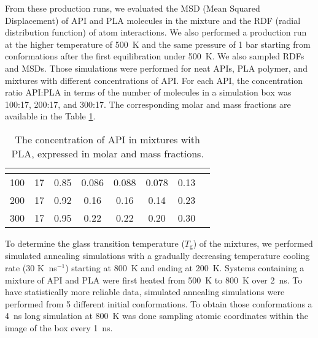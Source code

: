 From these production runs, we evaluated the MSD (Mean Squared Displacement) of API and PLA molecules in the mixture and the RDF (radial distribution function) of atom interactions. We also performed a production run at the higher temperature of 500~K and the same pressure of 1 bar starting from conformations after the first equilibration under 500~K. We also sampled RDFs and MSDs. Those simulations were performed for neat APIs, PLA polymer, and mixtures with different concentrations of API. For each API, the concentration ratio API:PLA in terms of the number of molecules in a simulation box was 100:17, 200:17, and 300:17. The corresponding molar and mass fractions are available in the Table \ref{tab:fractions}.

\begin{table}[h]
	\centering
	\caption{The concentration of API in mixtures with PLA, expressed in molar and mass fractions.}
	\begin{tabular}{cccccccc}
		\toprule
		{\textbf{\boldmath{$N_{\text{API}}$}}} &
		{\textbf{\boldmath{$N_{\text{PLA}}$}}} &
		{\textbf{\boldmath{$x_{\text{API}}$}}} & {\textbf{\boldmath{$w_{\text{nap}}$}}} & {\textbf{\boldmath{$w_{\text{cbz}}$}}} & {\textbf{\boldmath{$w_{\text{ibu}}$}}} & {\textbf{\boldmath{$w_{\text{indo}}$}}} \\
		\midrule
		100 & 17 & 0.85 & 0.086 & 0.088 & 0.078 & 0.13 \\
		200 & 17 & 0.92 & 0.16 & 0.16 & 0.14 & 0.23 \\
		300 & 17 & 0.95 & 0.22 & 0.22 & 0.20 & 0.30 \\
		\bottomrule
	\end{tabular}
	\label{tab:fractions}
\end{table} 

To determine the glass transition temperature ($T_\mathrm{g}$) of the mixtures, we performed simulated annealing simulations with a gradually decreasing temperature cooling rate (30 K$\ $ ns$^{-1}$) starting at 800~K and ending at 200~K. Systems containing a mixture of API and PLA were first heated from 500~K to 800~K over 2~ns. To have statistically more reliable data, simulated annealing simulations were performed from 5 different initial conformations. To obtain those conformations a 4~ns long simulation at 800~K was done sampling atomic coordinates within the image of the box every 1~ns.  